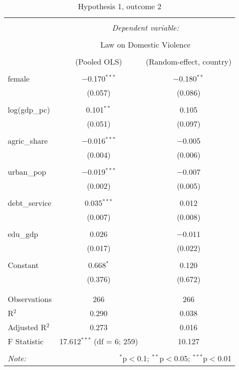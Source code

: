 \documentclass[12pt]{article}
\begin{document}
\begin{table}[!htbp] \centering 
  \caption{Hypothesis 1, outcome 2} 
  \label{} 
\begin{tabular}{@{\extracolsep{5pt}}lcc} 
\\[-1.8ex]\hline 
\hline \\[-1.8ex] 
 & \multicolumn{2}{c}{\textit{Dependent variable:}} \\ 
\cline{2-3} 
\\[-1.8ex] & \multicolumn{2}{c}{Law on Domestic Violence} \\ 
\\[-1.8ex] & (Pooled OLS) & (Random-effect, country)\\ 
\hline \\[-1.8ex] 
 female & $-$0.170$^{***}$ & $-$0.180$^{**}$ \\ 
  & (0.057) & (0.086) \\ 
  & & \\ 
 log(gdp\_pc) & 0.101$^{**}$ & 0.105 \\ 
  & (0.051) & (0.097) \\ 
  & & \\ 
 agric\_share & $-$0.016$^{***}$ & $-$0.005 \\ 
  & (0.004) & (0.006) \\ 
  & & \\ 
 urban\_pop & $-$0.019$^{***}$ & $-$0.007 \\ 
  & (0.002) & (0.005) \\ 
  & & \\ 
 debt\_service & 0.035$^{***}$ & 0.012 \\ 
  & (0.007) & (0.008) \\ 
  & & \\ 
 edu\_gdp & 0.026 & $-$0.011 \\ 
  & (0.017) & (0.022) \\ 
  & & \\ 
 Constant & 0.668$^{*}$ & 0.120 \\ 
  & (0.376) & (0.672) \\ 
  & & \\ 
\hline \\[-1.8ex] 
Observations & 266 & 266 \\ 
R$^{2}$ & 0.290 & 0.038 \\ 
Adjusted R$^{2}$ & 0.273 & 0.016 \\ 
F Statistic & 17.612$^{***}$ (df = 6; 259) & 10.127 \\ 
\hline 
\hline \\[-1.8ex] 
\textit{Note:}  & \multicolumn{2}{r}{$^{*}$p$<$0.1; $^{**}$p$<$0.05; $^{***}$p$<$0.01} \\ 
\end{tabular} 
\end{table} 
\end{document}
